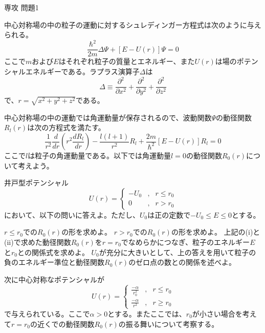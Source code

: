 \documentclass[fleqn]{jbook}
\begin{document}
\begin{question}{専攻 問題1}{}

中心対称場の中の粒子の運動に対するシュレディンガー方程式は次のように与えられる。
\[ \frac{\hbar^2}{2m}\Delta \Psi+[E-U(r)]\Psi =0 \]
ここで$m$および$E$はそれぞれ粒子の質量とエネルギー、また$U(r)$は場のポテンシャルエネルギーである。ラプラス演算子$\Delta$は
\[ \Delta\equiv\frac{\partial^2}{\partial x^2}+\frac{\partial^2}{\partial y^2}+\frac{\partial^2}{\partial z^2} \]
で、$r=\sqrt{x^2+y^2+z^2}$である。

中心対称場の中の運動では角運動量が保存されるので、波動関数$\Psi$の動径関数$R_l(r)$は次の方程式を満たす。
\[\frac{1}{r^2}\frac{d}{dr}\left(r^2\frac{dR_l}{dr}\right)-\frac{l(l+1)}{r^2}R_l+\frac{2m}{\hbar^2}[E-U(r)]R_l=0 \]
ここで$l$は粒子の角運動量である。以下では角運動量$l=0$の動径関数$R_0(r)$について考えよう。

\begin{subquestions}
\SubQuestion
井戸型ポテンシャル
\[ 
U(r)=\left\{ 
\begin{array}{rcc}
-U_0 & , & r \leq r_0 \\
0    & , & r > r_0  
\end{array}
\right.
\]
において、以下の問いに答えよ。ただし、$U_0$は正の定数で$-U_0\leq E \leq 0$とする。
\begin{subsubquestions}
\SubSubQuestion
$r\leq r_0$での$R_0(r)$の形を求めよ。
\SubSubQuestion
$r>r_0$での$R_0(r)$の形を求めよ。
\SubSubQuestion
上記の(i)と(ii)で求めた動径関数$R_0(r)$を$r=r_0$でなめらかにつなぎ、粒子のエネルギー$E$と$r_0$との関係式を求めよ。
\SubSubQuestion
$U_0$が充分に大きいとして、上の答えを用いて粒子の負のエネルギー準位と動径関数$R_0(r)$のゼロ点の数との関係を述べよ。
\end{subsubquestions}

\SubQuestion
次に中心対称なポテンシャルが
\[ U(r)=\left\{
\begin{array}{rcc} 
\frac{-\alpha}{r_0^2} & , & r \leq r_0 \\
\frac{-\alpha}{r^2}  & , & r\geq r_0 
\end{array}
\right.
\]
で与えられている。ここで$\alpha>0$とする。またここでは、$r_0$が小さい場合を考えて$r=r_0$の近くでの動径関数$R_0(r)$の振る舞いについて考察する。


\end{subquestions}
\end{question}
\end{document}
